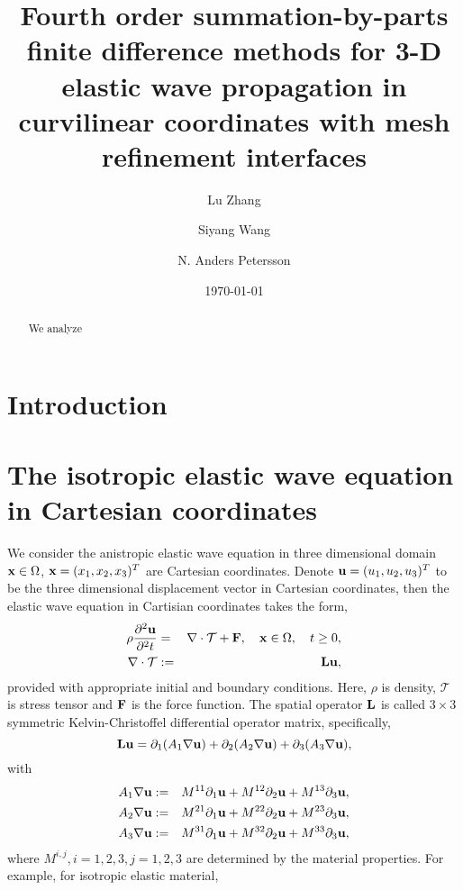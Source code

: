 \documentclass[a4paper]{article}
\title{Fourth order summation-by-parts finite difference methods for  3-D elastic wave propagation in curvilinear coordinates with mesh refinement interfaces}
\date{\today}
\author{ Lu Zhang \and Siyang Wang \and N. Anders Petersson}
\begin{document}
\maketitle

\begin{abstract}
We analyze
\end{abstract}

\section{Introduction}

\section{The isotropic elastic wave equation in Cartesian coordinates}
We consider the anistropic elastic wave equation in three dimensional domain ${\bf x} \in \Omega$, ${\bf x} = (x_1,x_2,x_3)^T$ are Cartesian coordinates. Denote ${\bf u} = (u_1,u_2,u_3)^T$ to be the three dimensional displacement vector in Cartesian coordinates, then the elastic wave equation in Cartisian coordinates takes the form,
\begin{eqnarray*}
    \rho\frac{\partial^2{\bf u}}{\partial^2 t} &=& \nabla\cdot\mathcal{T} + {\bf F}, \ \ \ {\bf x}\in\Omega,\ \ \ t\geq 0,\\
    \nabla\cdot\mathcal{T} &:=& {\bf Lu},
\end{eqnarray*}
provided with appropriate initial and boundary conditions. Here, $\rho$ is density, $\mathcal{T}$ is stress tensor and ${\bf F}$ is the force function. The spatial operator ${\bf L}$ is called $3\times3$ symmetric Kelvin-Christoffel differential operator matrix, specifically,
\begin{equation*}
    {\bf L u} = \partial_1(A_1\nabla{\bf u}) + \partial_2(A_2\nabla{\bf u}) + \partial_3(A_3\nabla{\bf u}),
\end{equation*}
with
\begin{eqnarray*}
A_1\nabla{\bf u} &:=& M^{11}\partial_1{\bf u} + M^{12}\partial_2{\bf u} + M^{13}\partial_3{\bf u}, \\
A_2\nabla{\bf u} &:=& M^{21}\partial_1{\bf u} + M^{22}\partial_2{\bf u} + M^{23}\partial_3{\bf u}, \\
A_3\nabla{\bf u} &:=& M^{31}\partial_1{\bf u} + M^{32}\partial_2{\bf u} + M^{33}\partial_3{\bf u},
\end{eqnarray*}
where $M^{i,j}, i = 1,2,3, j = 1,2,3$ are determined by the material properties. For example, for isotropic elastic material,
\end{document}
